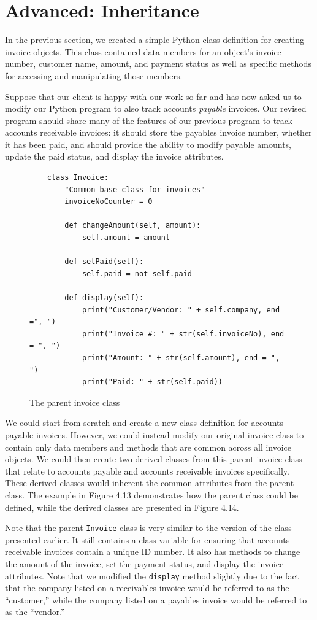 \documentclass{book}
\begin{document}
\section{Advanced: Inheritance}

In the previous section, we created a simple Python class definition for creating invoice objects. This class contained data members for an object's invoice number, customer name, amount, and payment status as well as specific methods for accessing and manipulating those members. 

Suppose that our client is happy with our work so far and has now asked us to modify our Python program to also track accounts \textit{payable} invoices. Our revised program should share many of the features of our previous program to track accounts receivable invoices: it should store the payables invoice number, whether it has been paid, and should provide the ability to modify payable amounts, update the paid status, and display the invoice attributes. 

\begin{figure}[h]
	\caption{The parent invoice class}
	\begin{lstlisting}
	class Invoice:
		"Common base class for invoices"
		invoiceNoCounter = 0
	
		def changeAmount(self, amount):
			self.amount = amount
	
		def setPaid(self):
			self.paid = not self.paid
	
		def display(self):
			print("Customer/Vendor: " + self.company, end =", ") 
			print("Invoice #: " + str(self.invoiceNo), end = ", ")
			print("Amount: " + str(self.amount), end = ", ")
			print("Paid: " + str(self.paid))
	\end{lstlisting}
\end{figure}

We could start from scratch and create a new class definition for accounts payable invoices. However, we could instead modify our original invoice class to contain only data members and methods that are common across all invoice objects. We could then create two derived classes from this parent invoice class that relate to accounts payable and accounts receivable invoices specifically. These derived classes would inherent the common attributes from the parent class. The example in Figure 4.13 demonstrates how the parent class could be defined, while the derived classes are presented in Figure 4.14.

Note that the parent \texttt{Invoice} class is very similar to the version of the class presented earlier. It still contains a class variable for ensuring that accounts receivable invoices contain a unique ID number. It also has methods to change the amount of the invoice, set the payment status, and display the invoice attributes.  Note that we modified the \texttt{display} method slightly due to the fact that the company listed on a receivables invoice would be referred to as the ``customer,'' while the company listed on a payables invoice would be referred to as the ``vendor.''
\end{document}
